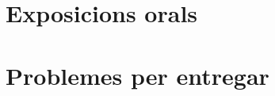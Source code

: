 \documentclass[11pt,fleqn]{book} %
\newcounter{let} \setcounter{let}{0}
\renewcommand{\1}{\mathbf{1}}
\newcommand{\0}{\mathbf{0}}
\begin{document}
\chapter{Exposicions orals}
{
\let\subsection\section
\let\subsubsection\subsection
\let\paragraph\subsubsection

}

\chapter{Problemes per entregar}
{
\let\subsection\section
\let\subsubsection\subsection
\let\paragraph\subsubsection

}
\end{document}
